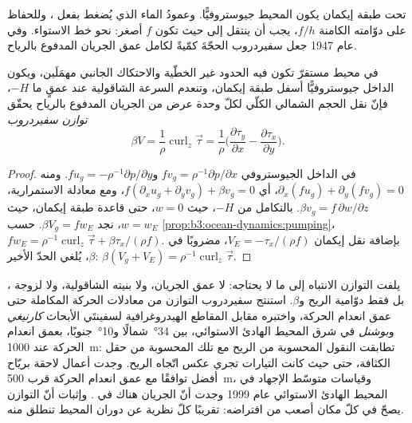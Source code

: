 تحت طبقة إيكمان يكون المحيط جيوستروفيًّا. وعمودُ الماء الذي
يُضغط بفعل ، وللحفاظ على دوّامته الكامنة $f/h$، يجب
أن ينتقل إلى حيث تكون $f$ أصغر: نحو خط الاستواء. وفي عام 1947 جعل  سفيردروب
الحجّةَ كمّيةً لكامل عمق الجريان المدفوع بالرياح.

\begin{theorem}\label{thm:b3:ocean-dynamics:sverdrup}
في محيط مستقرّ تكون فيه الحدود غير الخطّية والاحتكاك الجانبي
مهمَلَين، ويكون الداخل جيوستروفيًّا أسفل طبقة إيكمان، وتنعدم
السرعة الشاقولية عند عمقٍ ما $-H$، فإنّ نقل الحجم الشمالي الكلّي لكلّ وحدة عرض
من الجريان المدفوع بالرياح يحقّق \emph{توازن
سفيردروب}
\[
\beta V = \frac{1}{\rho}\operatorname{curl}_z\vec\tau
= \frac{1}{\rho}\Big(\frac{\partial\tau_y}{\partial x} -
\frac{\partial\tau_x}{\partial y}\Big) .
\]
\end{theorem}

\begin{proof}
في الداخل الجيوستروفي $fv_g = \rho^{-1}\partial p/\partial x$
و$fu_g = -\rho^{-1}\partial p/\partial y$. ومنه $\partial_x(fu_g) +
\partial_y(fv_g) = 0$، أي $f(\partial_xu_g + \partial_yv_g) + \beta
v_g = 0$، ومع معادلة الاستمرارية، $\beta v_g = f\,\partial w/\partial z$.
بالتكامل من $-H$، حيث $w = 0$، حتى قاعدة طبقة إيكمان،
حيث $w = w_E$، نجد $\beta V_g = fw_E$. حسب
\cref{prop:b3:ocean-dynamics:pumping}، $fw_E = \rho^{-1}\operatorname{curl}_z
\vec\tau + \beta\tau_x/(\rho f)$. بإضافة نقل إيكمان $V_E =
-\tau_x/(\rho f)$، مضروبًا في $\beta$، يُلغي الحدّ الأخير:
$\beta(V_g + V_E) = \rho^{-1}\operatorname{curl}_z\vec\tau$.
\end{proof}

يلفت التوازن الانتباه إلى ما لا يحتاجه: لا عمق الجريان،
ولا بنيته الشاقولية، ولا لزوجة ، بل فقط
دوّامية الريح و$\beta$. استنتج سفيردروب التوازن من معادلات
الحركة المكاملة حتى عمق انعدام الحركة، واختبره مقابل
المقاطع الهيدروغرافية لسفينتَي الأبحاث \emph{كارنيغي}
و\emph{بوشنل} في شرق المحيط الهادئ الاستوائي، بين \ang{34}~شمالًا
و\ang{10}~جنوبًا، بعمق انعدام الحركة عند \qty{1000}{m}: تطابقت النقول
المحسوبة من الريح مع تلك المحسوبة من حقل الكثافة، حتى حيث كانت
التيارات تجري عكس اتّجاه الريح. وجدت أعمال لاحقة بريّاح أفضل
توافقًا مع عمق انعدام الحركة قرب \qty{500}{m}،
وقياسات متوسّط الإجهاد في المحيط الهادئ الاستوائي عام 1999 وجدت أنّ
الجريان هناك في . وإثبات أنّ التوازن يصحّ في كلّ مكان
أصعب من افتراضه: تقريبًا كلّ نظرية عن دوران المحيط
تنطلق منه.

